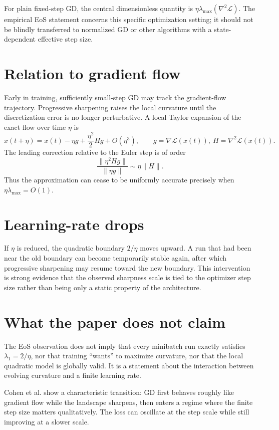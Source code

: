 \documentclass[11pt,a4paper,oneside,openany]{memoir}
\theoremstyle{definition}
\begin{document}
\begin{paperbox}
For plain fixed-step GD, the central dimensionless quantity is $\eta\lambda_{\max}(\nabla^2\mathcal L)$.  The empirical EoS statement concerns this specific optimization setting; it should not be blindly transferred to normalized GD or other algorithms with a state-dependent effective step size.
\end{paperbox}

\section{Relation to gradient flow}
Early in training, sufficiently small-step GD may track the gradient-flow trajectory.  Progressive sharpening raises the local curvature until the discretization error is no longer perturbative.  A local Taylor expansion of the exact flow over time $\eta$ is
\[
x(t+\eta)=x(t)-\eta g+\frac{\eta^2}{2}Hg+O(\eta^3),
\qquad g=\nabla\mathcal L(x(t)),\ H=\nabla^2\mathcal L(x(t)).
\]
The leading correction relative to the Euler step is of order
\[
\frac{\|\eta^2Hg\|}{\|\eta g\|}\sim \eta\|H\|.
\]
Thus the approximation can cease to be uniformly accurate precisely when $\eta\lambda_{\max}=O(1)$.

\section{Learning-rate drops}
If $\eta$ is reduced, the quadratic boundary $2/\eta$ moves upward.  A run that had been near the old boundary can become temporarily stable again, after which progressive sharpening may resume toward the new boundary.  This intervention is strong evidence that the observed sharpness scale is tied to the optimizer step size rather than being only a static property of the architecture.

\section{What the paper does not claim}
The EoS observation does not imply that every minibatch run exactly satisfies $\lambda_1=2/\eta$, nor that training ``wants'' to maximize curvature, nor that the local quadratic model is globally valid.  It is a statement about the interaction between evolving curvature and a finite learning rate.

\begin{presentbox}
Cohen et al. show a characteristic transition: GD first behaves roughly like gradient flow while the landscape sharpens, then enters a regime where the finite step size matters qualitatively.  The loss can oscillate at the step scale while still improving at a slower scale.
\end{presentbox}
\end{document}
